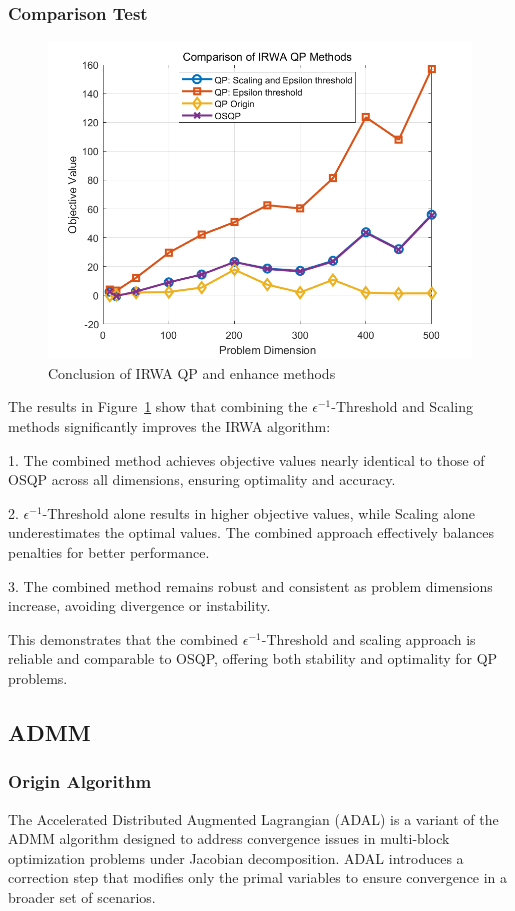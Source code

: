 \documentclass{article}
\begin{document}
\subsubsection{Comparison Test}
\begin{figure}[H]
    \centering
    \includegraphics[width=0.75\linewidth]{fig/IRWA_Comparison_Conclude.png}
    \caption{Conclusion of IRWA QP and enhance methods}
    \label{fig:Conclusion of IRWA QP and enhance methods}
\end{figure}

The results in Figure~\ref{fig:Conclusion of IRWA QP and enhance methods} show that combining the \(\epsilon^{-1}\)-Threshold and Scaling methods significantly improves the IRWA algorithm:

1. The combined method achieves objective values nearly identical to those of OSQP across all dimensions, ensuring optimality and accuracy.

2. \(\epsilon^{-1}\)-Threshold alone results in higher objective values, while Scaling alone underestimates the optimal values. The combined approach effectively balances penalties for better performance.

3. The combined method remains robust and consistent as problem dimensions increase, avoiding divergence or instability.

This demonstrates that the combined \(\epsilon^{-1}\)-Threshold and scaling approach is reliable and comparable to OSQP, offering both stability and optimality for QP problems.

\subsection{ADMM}
\subsubsection{Origin Algorithm}
The Accelerated Distributed Augmented Lagrangian (ADAL) is a variant of the ADMM algorithm designed to address convergence issues in multi-block optimization problems under Jacobian decomposition\cite{yang2022surveyadmmvariantsdistributed}. ADAL introduces a correction step that modifies only the primal variables to ensure convergence in a broader set of scenarios.
\end{document}
